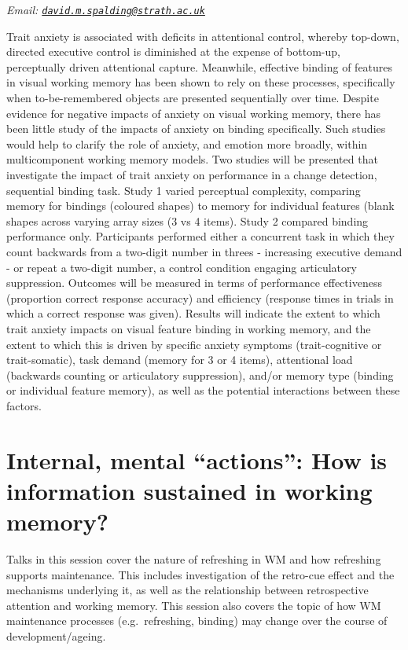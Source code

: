 \documentclass[12pt,]{book}
\begin{document}
\emph{Email: \href{mailto:david.m.spalding@strath.ac.uk}{\nolinkurl{david.m.spalding@strath.ac.uk}}}

Trait anxiety is associated with deficits in attentional control, whereby top-down, directed executive control is diminished at the expense of bottom-up, perceptually driven attentional capture. Meanwhile, effective binding of features in visual working memory has been shown to rely on these processes, specifically when to-be-remembered objects are presented sequentially over time. Despite evidence for negative impacts of anxiety on visual working memory, there has been little study of the impacts of anxiety on binding specifically. Such studies would help to clarify the role of anxiety, and emotion more broadly, within multicomponent working memory models. Two studies will be presented that investigate the impact of trait anxiety on performance in a change detection, sequential binding task. Study 1 varied perceptual complexity, comparing memory for bindings (coloured shapes) to memory for individual features (blank shapes across varying array sizes (3 vs 4 items). Study 2 compared binding performance only. Participants performed either a concurrent task in which they count backwards from a two-digit number in threes - increasing executive demand - or repeat a two-digit number, a control condition engaging articulatory suppression. Outcomes will be measured in terms of performance effectiveness (proportion correct response accuracy) and efficiency (response times in trials in which a correct response was given). Results will indicate the extent to which trait anxiety impacts on visual feature binding in working memory, and the extent to which this is driven by specific anxiety symptoms (trait-cognitive or trait-somatic), task demand (memory for 3 or 4 items), attentional load (backwards counting or articulatory suppression), and/or memory type (binding or individual feature memory), as well as the potential interactions between these factors.

\hypertarget{internal-mental-actions-how-is-information-sustained-in-working-memory}{%
\chapter{Internal, mental ``actions'': How is information sustained in working memory?}\label{internal-mental-actions-how-is-information-sustained-in-working-memory}}

Talks in this session cover the nature of refreshing in WM and how refreshing supports maintenance. This includes investigation of the retro-cue effect and the mechanisms underlying it, as well as the relationship between retrospective attention and working memory. This session also covers the topic of how WM maintenance processes (e.g.~refreshing, binding) may change over the course of development/ageing.
\end{document}
